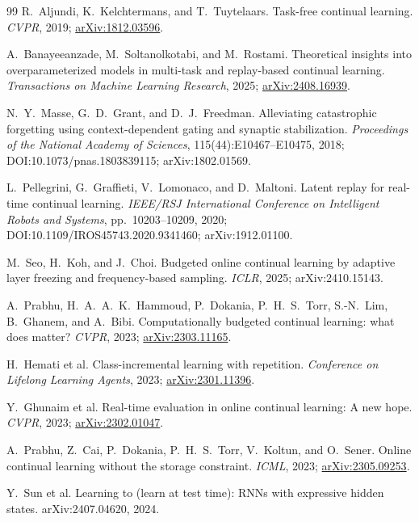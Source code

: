 \documentclass[11pt]{article}
\begin{document}
\begin{thebibliography}{99}
R.~Aljundi, K.~Kelchtermans, and T.~Tuytelaars.
Task-free continual learning.
\emph{CVPR}, 2019;
\href{https://arxiv.org/abs/1812.03596}{arXiv:1812.03596}.

A.~Banayeeanzade, M.~Soltanolkotabi, and M.~Rostami.
Theoretical insights into overparameterized models in multi-task and
replay-based continual learning.
\emph{Transactions on Machine Learning Research}, 2025;
\href{https://arxiv.org/abs/2408.16939}{arXiv:2408.16939}.

 N.~Y.~Masse, G.~D.~Grant, and D.~J.~Freedman.
Alleviating catastrophic forgetting using context-dependent gating and
synaptic stabilization.
\emph{Proceedings of the National Academy of Sciences},
115(44):E10467--E10475, 2018; DOI:10.1073/pnas.1803839115;
arXiv:1802.01569.

L.~Pellegrini, G.~Graffieti, V.~Lomonaco, and D.~Maltoni.
Latent replay for real-time continual learning.
\emph{IEEE/RSJ International Conference on Intelligent Robots and Systems},
pp.~10203--10209, 2020; DOI:10.1109/IROS45743.2020.9341460;
arXiv:1912.01100.

M.~Seo, H.~Koh, and J.~Choi.
Budgeted online continual learning by adaptive layer freezing and
frequency-based sampling.
\emph{ICLR}, 2025; arXiv:2410.15143.

A.~Prabhu, H.~A.~A.~K.~Hammoud, P.~Dokania, P.~H.~S.~Torr, S.-N.~Lim,
B.~Ghanem, and A.~Bibi.
Computationally budgeted continual learning: what does matter?
\emph{CVPR}, 2023;
\href{https://arxiv.org/abs/2303.11165}{arXiv:2303.11165}.

H.~Hemati et al.
Class-incremental learning with repetition.
\emph{Conference on Lifelong Learning Agents}, 2023;
\href{https://arxiv.org/abs/2301.11396}{arXiv:2301.11396}.

Y.~Ghunaim et al.
Real-time evaluation in online continual learning: A new hope.
\emph{CVPR}, 2023;
\href{https://arxiv.org/abs/2302.01047}{arXiv:2302.01047}.

A.~Prabhu, Z.~Cai, P.~Dokania, P.~H.~S.~Torr, V.~Koltun, and O.~Sener.
Online continual learning without the storage constraint.
\emph{ICML}, 2023;
\href{https://arxiv.org/abs/2305.09253}{arXiv:2305.09253}.

 Y.~Sun et al.
Learning to (learn at test time): RNNs with expressive hidden states.
arXiv:2407.04620, 2024.


\end{thebibliography}
\end{document}
